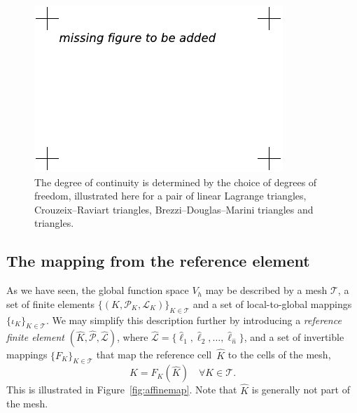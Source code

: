 \begin{figure}
  \begin{center}
    \includegraphics[width=\largefig]{chapters/kirby-7/pdf/missing-figure.pdf}
    \caption{The degree of continuity is determined by the choice of
      degrees of freedom, illustrated here for a pair of linear
      Lagrange triangles, Crouzeix--Raviart triangles,
      Brezzi--Douglas--Marini triangles and \nedelec{} triangles.}
    \label{fig:continuity}
  \end{center}
\end{figure}

\subsection{The mapping from the reference element}


As we have seen, the global function space $V_h$ may be described by a
mesh $\mathcal{T}$, a set of finite elements
$\{(K,\mathcal{P}_K,\mathcal{L}_K)\}_{K\in\mathcal{T}}$ and a set of
local-to-global mappings $\{\iota_K\}_{K\in\mathcal{T}}$. We may
simplify this description further by introducing a \emph{reference
finite element} $(\hat{K},\hat{\mathcal{P}},\hat{\mathcal{L}})$, where
$\hat{\mathcal{L}} =
\{\hat{\ell}_1,\hat{\ell}_2,\ldots,\hat{\ell}_{\hat{n}}\}$, and a set
of invertible mappings $\{F_K\}_{K\in\mathcal{T}}$ that map the
reference cell~$\hat{K}$ to the cells of the mesh,
\begin{equation}
  K = F_K(\hat{K}) \quad \forall K \in \mathcal{T}.
\end{equation}
This is illustrated in Figure~\ref{fig:affinemap}. Note that $\hat{K}$
is generally not part of the mesh.

